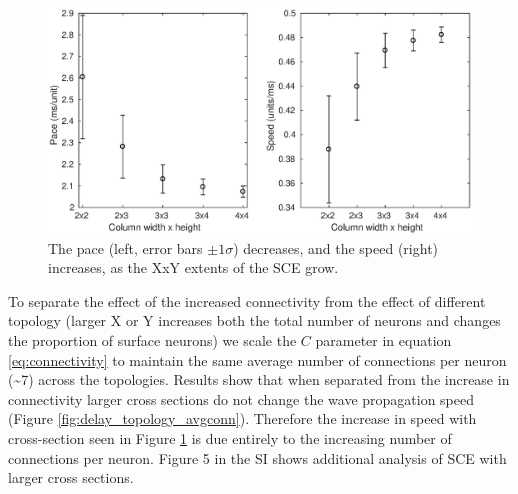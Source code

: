 \documentclass[12pt]{article}
\begin{document}
\begin{figure}[!htb]
 \caption{ The pace (left, error bars $\pm 1 \sigma$) decreases, and the speed (right) increases, as the XxY extents of the SCE grow.}
 \label{fig:delay_topology}
 \centering
   \includegraphics[width=\textwidth]{fig/WaveSpeed_Topology}
\end{figure}

To separate the effect of the increased connectivity from the effect of different topology (larger X or Y increases both the total number of neurons and changes the proportion of surface neurons) we scale the $C$ parameter in equation \ref{eq:connectivity} to maintain the same average number of connections per neuron (\textasciitilde{}7) across the topologies.
Results show that when separated from the increase in connectivity larger cross sections do not change the wave propagation speed (Figure \ref{fig:delay_topology_avgconn}).
Therefore the increase in speed with cross-section seen in Figure \ref{fig:delay_topology} is due entirely to the increasing number of connections per neuron.
Figure 5 in the SI shows additional analysis of SCE with larger cross sections. 
\end{document}
